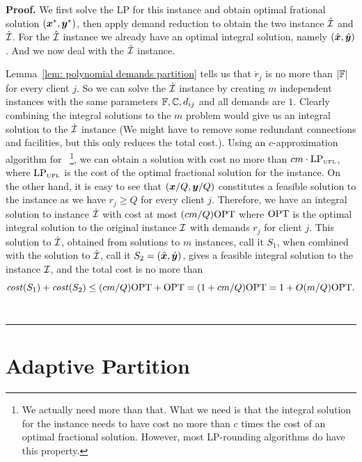 \documentclass[oneside,final]{ucr}
\newenvironment{proof}[1][Proof]{\textbf{#1.} }{\ \rule{0.5em}{0.5em}}
\begin{document}
\begin{proof}
  We first solve the LP for this instance and obtain optimal
  frational solution $(\boldsymbol{x}^\ast, \boldsymbol{y}^\ast)$, then apply
  demand reduction to obtain the two instance $\hat {\mathcal{I}}$
  and $\dot {\mathcal{I}}$. For the $\hat {\mathcal{I}}$ instance we already
  have an optimal integral solution, namely
  $(\hat{\boldsymbol{x}},\hat{\boldsymbol{y}})$. And we now deal with the
  $\dot{\mathcal{I}}$ instance.

  Lemma~\ref{lem: polynomial demands partition} tells us
  that $\dot r_j$ is no more than $|\mathbb{F}|$ for every
  client $j$. So we can solve the $\dot {\mathcal{I}}$ instance by
  creating $m$ independent {\UFL} instances with the same
  parameters $\mathbb{F}, \mathbb{C}, d_{ij}$ and all demands
  are $1$. Clearly combining the integral solutions to the
  $m$ {\UFL} problem would give us an integral solution to
  the $\dot {\mathcal{I}}$ instance (We might have to remove some
  redundant connections and facilities, but this only
  reduces the total cost.). Using an $c$-approximation
  algorithm for {\UFL}~\footnote{We actually need more than
    that. What we need is that the integral solution for the
    {\UFL} instance needs to have cost no more than $c$
    times the cost of an optimal fractional
    solution. However, most LP-rounding algorithms do have
    this property.}, we can obtain a solution with cost no
  more than $cm\cdot\mbox{\rm LP}_{\mbox{\tiny\rm UFL}}$, where
  $\mbox{\rm LP}_{\mbox{\tiny\rm UFL}}$ is the cost of the optimal fractional
  solution for the {\UFL} instance. On the other hand, it is
  easy to see that $(\boldsymbol{x}/Q,\boldsymbol{y}/Q)$ constitutes a feasible
  solution to the {\UFL} instance as we have $r_j \geq Q$
  for every client $j$. Therefore, we have an integral
  solution to instance $\dot{\mathcal{I}}$ with cost at most $(cm/Q)
  \mbox{\rm OPT}$ where $\mbox{\rm OPT}$ is the optimal integral solution to the
  original {\FTFP} instance $\mathcal{I}$ with demands $r_j$ for
  client $j$. This solution to $\dot{\mathcal{I}}$, obtained from
  solutions to $m$ {\UFL} instances, call it $S_1$, when
  combined with the solution to $\hat{\mathcal{I}}$, call it $S_2 =
  (\hat{\boldsymbol{x}},\hat{\boldsymbol{y}})$, gives a feasible integral solution
  to the instance $\mathcal{I}$, and the total cost is no more
  than
  \begin{equation*}
    {\it cost}(S_1) + {\it cost}(S_2) \leq (cm/Q) \mbox{\rm OPT} + \mbox{\rm OPT} = (1 +
    cm/Q) \mbox{\rm OPT} = 1 + O(m/Q) \mbox{\rm OPT}.
  \end{equation*}
\end{proof}


\section{Adaptive Partition}
\label{sec: adaptive partitioning}
\end{document}
